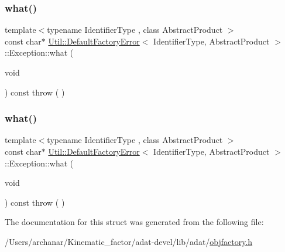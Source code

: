 \subsubsection{\texorpdfstring{what()}{what()}\hspace{0.1cm}{\footnotesize\ttfamily [2/3]}}
{\footnotesize\ttfamily template$<$typename Identifier\+Type , class Abstract\+Product $>$ \\
const char$\ast$ \mbox{\hyperlink{structUtil_1_1DefaultFactoryError}{Util\+::\+Default\+Factory\+Error}}$<$ Identifier\+Type, Abstract\+Product $>$\+::Exception\+::what (\begin{DoxyParamCaption}\item[{void}]{ }\end{DoxyParamCaption}) const throw ( ) \hspace{0.3cm}{\ttfamily [inline]}}

\mbox{\label{structUtil_1_1DefaultFactoryError_1_1Exception_a4f94d8b7f4d48002d88fe417a6659dbe}} 
\subsubsection{\texorpdfstring{what()}{what()}\hspace{0.1cm}{\footnotesize\ttfamily [3/3]}}
{\footnotesize\ttfamily template$<$typename Identifier\+Type , class Abstract\+Product $>$ \\
const char$\ast$ \mbox{\hyperlink{structUtil_1_1DefaultFactoryError}{Util\+::\+Default\+Factory\+Error}}$<$ Identifier\+Type, Abstract\+Product $>$\+::Exception\+::what (\begin{DoxyParamCaption}\item[{void}]{ }\end{DoxyParamCaption}) const throw ( ) \hspace{0.3cm}{\ttfamily [inline]}}



The documentation for this struct was generated from the following file\+:\begin{DoxyCompactItemize}
\item 
/\+Users/archanar/\+Kinematic\+\_\+factor/adat-\/devel/lib/adat/\mbox{\hyperlink{adat-devel_2lib_2adat_2objfactory_8h}{objfactory.\+h}}\end{DoxyCompactItemize}
